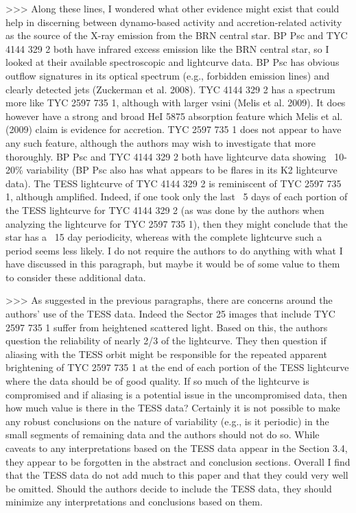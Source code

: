 >>> Along these lines, I wondered what other evidence might exist that could help in discerning between dynamo-based activity and accretion-related activity as the source of the X-ray emission from the BRN central star. BP Psc and TYC 4144 329 2 both have infrared excess emission like the BRN central star, so I looked at their available spectroscopic and lightcurve data. BP Psc has obvious outflow signatures in its optical spectrum (e.g., forbidden emission lines) and clearly detected jets (Zuckerman et al. 2008). TYC 4144 329 2 has a spectrum more like TYC 2597 735 1, although with larger vsini (Melis et al. 2009). It does however have a strong and broad HeI 5875 absorption feature which Melis et al. (2009) claim is evidence for accretion. TYC 2597 735 1 does not appear to have any such feature, although the authors may wish to investigate that more thoroughly. BP Psc and TYC 4144 329 2 both have lightcurve data showing ~10-20\% variability (BP Psc also has what appears to be flares in its K2 lightcurve data). The TESS lightcurve of TYC 4144 329 2 is reminiscent of TYC 2597 735 1, although amplified. Indeed, if one took only the last ~5 days of each portion of the TESS lightcurve for TYC 4144 329 2 (as was done by the authors when analyzing the lightcurve for TYC 2597 735 1), then they might conclude that the star has a ~15 day periodicity, whereas with the complete lightcurve such a period seems less likely. I do not require the authors to do anything with what I have discussed in this paragraph, but maybe it would be of some value to them to consider these additional data.

>>> As suggested in the previous paragraphs, there are concerns around the authors' use of the TESS data. Indeed the Sector 25 images that include TYC 2597 735 1 suffer from heightened scattered light. Based on this, the authors question the reliability of nearly 2/3 of the lightcurve. They then question if aliasing with the TESS orbit might be responsible for the repeated apparent brightening of TYC 2597 735 1 at the end of each portion of the TESS lightcurve where the data should be of good quality. If so much of the lightcurve is compromised and if aliasing is a potential issue in the uncompromised data, then how much value is there in the TESS data? Certainly it is not possible to make any robust conclusions on the nature of variability (e.g., is it periodic) in the small segments of remaining data and the authors should not do so. While caveats to any interpretations based on the TESS data appear in the Section 3.4, they appear to be forgotten in the abstract and conclusion sections. Overall I find that the TESS data do not add much to this paper and that they could very well be omitted. Should the authors decide to include the TESS data, they should minimize any interpretations and conclusions based on them.


